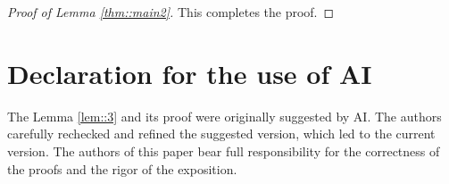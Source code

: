 \documentclass[11pt]{article}
\theoremstyle{definition}
\begin{document}
\begin{proof}[Proof of Lemma \ref{thm::main2}]
  This completes the proof.
\end{proof}














\section*{Declaration for the use of AI}
The Lemma \ref{lem::3} and its proof were originally suggested by AI. The authors carefully rechecked and refined the suggested version, which led to the current version. The authors of this paper bear full responsibility for the correctness of the proofs and the rigor of the exposition.
\end{document}

